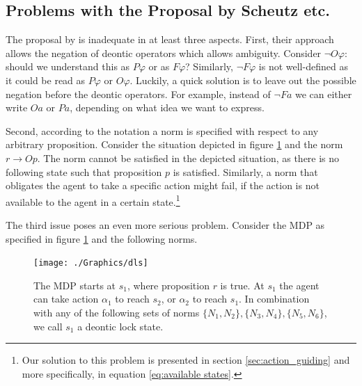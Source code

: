 \subsection{Problems with the Proposal by Scheutz etc.}
\label{sec:problems_scheutz}

The proposal by \citet{arnold2017value} is inadequate in at least three aspects. First, their approach allows the negation of deontic operators which allows ambiguity. Consider $\neg O\varphi$: should we understand this as $P \varphi$ or as $F \varphi$? Similarly, $\neg F \varphi$ is not well-defined as it could be read as $P \varphi$ or $O \varphi$. Luckily, a quick solution is to leave out the possible negation before the deontic operators. For example, instead of $\neg Fa$ we can either write $Oa$ or $Pa$, depending on what idea we want to express.  

Second, according to the notation a norm is specified with respect to any arbitrary proposition. Consider the situation depicted in figure \ref{fig:dls} and the norm $r \rightarrow Op$. The norm cannot be satisfied in the depicted situation, as there is no following state such that proposition $p$ is satisfied. Similarly, a norm that obligates the agent to take a specific action might fail, if the action is not available to the agent in a certain state.\footnote{Our solution to this problem is presented in section \ref{sec:action_guiding} and more specifically, in equation \ref{eq:available states}.} 


The third issue poses an even more serious problem. Consider the MDP as specified in figure \ref{fig:dls} and the following norms.

\begin{figure}
\begin{centering}
	\texttt{[image: ./Graphics/dls]} 
	\caption{The MDP starts at $s_1$, where proposition $r$ is true. At $s_1$ the agent can take action $\alpha_1$ to reach $s_2$, or $\alpha_2$ to reach $s_1$. In combination with any of the following sets of norms $\{N_1,N_2\}, \{N_3,N_4\}, \{N_5,N_6\}$, we call $s_1$ a deontic lock state.}
	\label{fig:dls}
\end{centering}
\end{figure}

